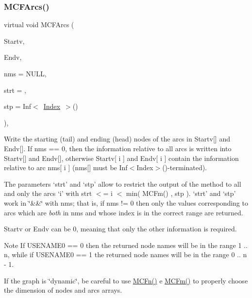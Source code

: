 \subsubsection{\texorpdfstring{M\+C\+F\+Arcs()}{MCFArcs()}}
{\footnotesize\ttfamily virtual void M\+C\+F\+Arcs (\begin{DoxyParamCaption}\item[{\mbox{\hyperlink{class_m_c_f_class_ace3388eb329ff0551a0b86b6c67e33d8}{Index\+\_\+\+Set}}}]{Startv,  }\item[{\mbox{\hyperlink{class_m_c_f_class_ace3388eb329ff0551a0b86b6c67e33d8}{Index\+\_\+\+Set}}}]{Endv,  }\item[{\mbox{\hyperlink{class_m_c_f_class_a81575b2d4e4d5636b17170432150ae69}{c\+Index\+\_\+\+Set}}}]{nms = {\ttfamily NULL},  }\item[{\mbox{\hyperlink{class_m_c_f_class_a76aaabb20535c51a2752b93f6c38fe54}{c\+Index}}}]{strt = {},  }\item[{\mbox{\hyperlink{class_m_c_f_class_ad53d6229d7ec28555a9c9c2fd9abf773}{Index}}}]{stp = {\ttfamily Inf$<$~\mbox{\hyperlink{class_m_c_f_class_ad53d6229d7ec28555a9c9c2fd9abf773}{Index}}~$>$()} }\end{DoxyParamCaption})\hspace{0.3cm}{\ttfamily [override]}, {\ttfamily [virtual]}}

Write the starting (tail) and ending (head) nodes of the arcs in Startv\mbox{[}\mbox{]} and Endv\mbox{[}\mbox{]}. If nms == 0, then the information relative to all arcs is written into Startv\mbox{[}\mbox{]} and Endv\mbox{[}\mbox{]}, otherwise Startv\mbox{[} i \mbox{]} and Endv\mbox{[} i \mbox{]} contain the information relative to arc nms\mbox{[} i \mbox{]} (nms\mbox{[}\mbox{]} must be Inf$<$\+Index$>$()-\/terminated).

The parameters `strt' and `stp' allow to restrict the output of the method to all and only the arcs `i' with strt $<$= i $<$ min( M\+C\+Fm() , stp ). `strt' and `stp' work in \char`\"{}\&\&\char`\"{} with nms; that is, if nms != 0 then only the values corresponding to arcs which are {\itshape both} in nms and whose index is in the correct range are returned.

Startv or Endv can be 0, meaning that only the other information is required.

\begin{DoxyNote}{Note}
If U\+S\+E\+N\+A\+M\+E0 == 0 then the returned node names will be in the range 1 .. n, while if U\+S\+E\+N\+A\+M\+E0 == 1 the returned node names will be in the range 0 .. n -\/ 1.

If the graph is \char`\"{}dynamic\char`\"{}, be careful to use \mbox{\hyperlink{class_m_c_f_class_a6438187f454e795c03a850bfab31be84}{M\+C\+Fn()}} e \mbox{\hyperlink{class_m_c_f_class_ab4d5a0d0fc49882de0b4eb3146f1b7a6}{M\+C\+Fm()}} to properly choose the dimension of nodes and arcs arrays. 
\end{DoxyNote}


